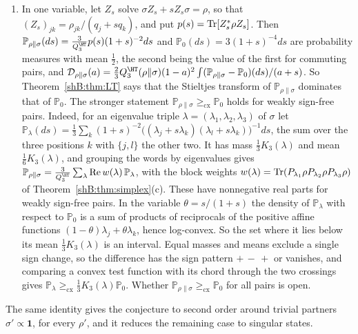 \begin{remark}
\begin{enumerate}[label=(\roman*)]
\item In one variable, let $Z_s$ solve $\sigma Z_s+sZ_s\sigma=\rho$, so that $(Z_s)_{jk}=\rho_{jk}/(q_j+sq_k)$, and put $p(s)=\operatorname{Tr}[Z_s^*\rho Z_s]$. Then $\mathbb P_{\rho\|\sigma}(ds)=\frac3{Q^\HT_3}p(s)(1+s)^{-2}ds$ and $\mathbb P_0(ds)=3(1+s)^{-4}ds$ are probability measures with mean $\frac12$, the second being the value of the first for commuting pairs, and $\mathcal D_{\rho\|\sigma}(a)=\frac23Q^\HT_3(\rho\|\sigma)(1-a)^2\int(\mathbb P_{\rho\|\sigma}-\mathbb P_0)(ds)/(a+s)$. So Theorem~\ref{shB:thm:LT} says that the Stieltjes transform of $\mathbb P_{\rho\|\sigma}$ dominates that of $\mathbb P_0$. The stronger statement $\mathbb P_{\rho\|\sigma}\ge_{\mathrm{cx}}\mathbb P_0$ holds for weakly sign-free pairs. Indeed, for an eigenvalue triple $\lambda=(\lambda_1,\lambda_2,\lambda_3)$ of $\sigma$ let $\mathbb P_\lambda(ds)=\frac13\sum_k(1+s)^{-2}\big((\lambda_j+s\lambda_k)(\lambda_l+s\lambda_k)\big)^{-1}ds$, the sum over the three positions $k$ with $\{j,l\}$ the other two. It has mass $\frac13K_3(\lambda)$ and mean $\frac16K_3(\lambda)$, and grouping the words by eigenvalues gives $\mathbb P_{\rho\|\sigma}=\frac3{Q^\HT_3}\sum_\lambda\mathrm{Re}\,w(\lambda)\,\mathbb P_\lambda$, with the block weights $w(\lambda)=\operatorname{Tr}(P_{\lambda_1}\rho P_{\lambda_2}\rho P_{\lambda_3}\rho)$ of Theorem~\ref{shB:thm:simplex}(c). These have nonnegative real parts for weakly sign-free pairs. In the variable $\theta=s/(1+s)$ the density of $\mathbb P_\lambda$ with respect to $\mathbb P_0$ is a sum of products of reciprocals of the positive affine functions $(1-\theta)\lambda_j+\theta\lambda_k$, hence log-convex. So the set where it lies below its mean $\frac13K_3(\lambda)$ is an interval. Equal masses and means exclude a single sign change, so the difference has the sign pattern $+\,-\,+$ or vanishes, and comparing a convex test function with its chord through the two crossings gives $\mathbb P_\lambda\ge_{\mathrm{cx}}\frac13K_3(\lambda)\mathbb P_0$. Whether $\mathbb P_{\rho\|\sigma}\ge_{\mathrm{cx}}\mathbb P_0$ for all pairs is open.
\end{enumerate}
\end{remark}

The same identity gives the conjecture to second order around trivial partners $\sigma'\propto\mathbf 1$, for every $\rho'$, and it reduces the remaining case to singular states.

